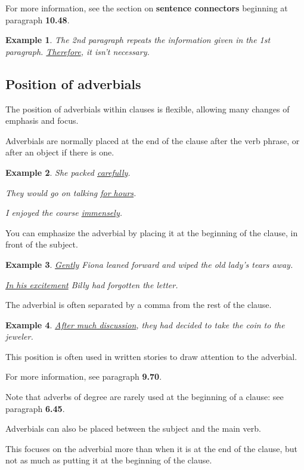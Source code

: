 \documentclass[oneside]{book}
\numberwithin{equation}{section}
\newtheorem{example}{Example}[section]
\begin{document}
For more information, see the section on \textbf{sentence connectors} beginning at paragraph \textbf{10.48}.
\begin{example}
    The 2nd paragraph repeats the information given in the 1st paragraph. \underline{Therefore}, it isn't necessary.
\end{example}

\subsection{Position of adverbials}
\noindent{} The position of adverbials within clauses is flexible, allowing many changes of emphasis and focus.

%
Adverbials are normally placed at the end of the clause after the verb phrase, or after an object if there is one.
\begin{example}
    She packed \underline{carefully}.
    
    They would go on talking \underline{for hours}.
    
    I enjoyed the course \underline{immensely}.
\end{example}
%
\noindent{} You can emphasize the adverbial by placing it at the beginning of the clause, in front of the subject.
\begin{example}
    \underline{Gently} Fiona leaned forward and wiped the old lady's tears away.
    
    \underline{In his excitement} Billy had forgotten the letter.
\end{example}
The adverbial is often separated by a comma from the rest of the clause.
\begin{example}
    \underline{After much discussion}, they had decided to take the coin to the jeweler.
\end{example}
This position is often used in written stories to draw attention to the adverbial.

For more information, see paragraph \textbf{9.70}.

%
Note that adverbs of degree are rarely used at the beginning of a clause: see paragraph \textbf{6.45}.

%
\noindent{} Adverbials can also be placed between the subject and the main verb.

This focuses on the adverbial more than when it is at the end of the clause, but not as much as putting it at the beginning of the clause.
\end{document}

